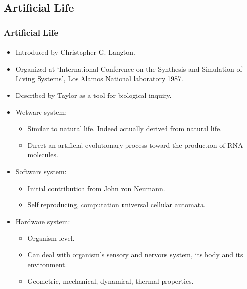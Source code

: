 \subsection{Artificial Life}

\frame
{
	\frametitle{Artificial Life}
	\framesubtitle{}

	\begin{itemize}
		\item Introduced by Christopher G. Langton.
		\item Organized at `International Conference on the Synthesis and Simulation of Living Systems', Los Alamos National laboratory 1987.
		\item Described by Taylor as a tool for biological inquiry.
		\item Wetware system:
			\begin{itemize}
				\item Similar to natural life. Indeed actually derived from natural life.
				\item Direct an artificial evolutionary process toward the production of RNA molecules.
			\end{itemize}
		\item Software system:
			\begin{itemize}
				\item Initial contribution from John von Neumann.
				\item Self reproducing, computation universal cellular automata.
			\end{itemize}
		\item Hardware system:
			\begin{itemize}
				\item Organism level.
				\item Can deal with organism's sensory and nervous system, its body and its environment.
				\item Geometric, mechanical, dynamical, thermal properties.
			\end{itemize}
	\end{itemize}
}

